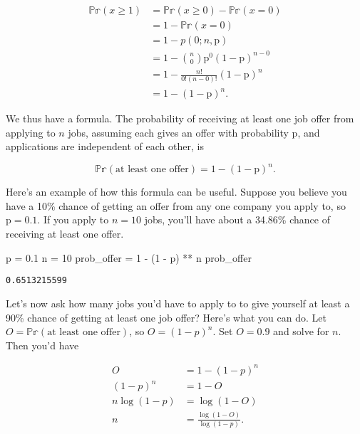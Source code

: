 \documentclass[
  letterpaper,
  DIV=11,
  numbers=noendperiod]{scrreprt}
\newenvironment{Shaded}{\begin{snugshade}}{\end{snugshade}}
\newcommand{\DecValTok}[1]{\textcolor[rgb]{0.68,0.00,0.00}{#1}}
\newcommand{\FloatTok}[1]{\textcolor[rgb]{0.68,0.00,0.00}{#1}}
\newcommand{\NormalTok}[1]{\textcolor[rgb]{0.00,0.23,0.31}{#1}}
\newcommand{\OperatorTok}[1]{\textcolor[rgb]{0.37,0.37,0.37}{#1}}
\begin{document}
\begin{align*}
\mathbb{Pr}(x \geq 1) &= \mathbb{Pr}(x \geq 0) - \mathbb{Pr}(x=0) \\
&= 1 - \mathbb{Pr}(x=0) \\
&= 1 - p(0;n,\text{p}) \\
&= 1 - \binom{n}{0} \text{p}^0 (1-\text{p})^{n-0} \\
&= 1 - \frac{n!}{0!(n-0)!} (1-\text{p})^n \\
&= 1 - (1-\text{p})^n.
\end{align*}

We thus have a formula. The probability of receiving at least one job
offer from applying to \(n\) jobs, assuming each gives an offer with
probability \(\text{p}\), and applications are independent of each
other, is

\[\mathbb{Pr}(\text{at least one offer}) = 1 - (1-\text{p})^n.\]

Here's an example of how this formula can be useful. Suppose you believe
you have a 10\% chance of getting an offer from any one company you
apply to, so \(\text{p}=0.1\). If you apply to \(n=10\) jobs, you'll
have about a 34.86\% chance of receiving at least one offer.

\begin{Shaded}
\begin{Highlighting}[]
\NormalTok{p }\OperatorTok{=} \FloatTok{0.1}
\NormalTok{n }\OperatorTok{=} \DecValTok{10}
\NormalTok{prob\_offer }\OperatorTok{=} \DecValTok{1} \OperatorTok{{-}}\NormalTok{ (}\DecValTok{1} \OperatorTok{{-}}\NormalTok{ p) }\OperatorTok{**}\NormalTok{ n}
\NormalTok{prob\_offer}
\end{Highlighting}
\end{Shaded}

\begin{verbatim}
0.6513215599
\end{verbatim}

Let's now ask how many jobs you'd have to apply to to give yourself at
least a 90\% chance of getting at least one job offer? Here's what you
can do. Let \(O = \mathbb{Pr}(\text{at least one offer})\), so
\(O = (1-p)^n\). Set \(O=0.9\) and solve for \(n\). Then you'd have

\begin{align*}
O &= 1 - (1-p)^n \\
(1-p)^n &= 1 - O \\
n \log(1-p) &= \log(1 - O) \\
n &= \frac{\log(1 - O)}{\log(1 - p)}.
\end{align*}
\end{document}
